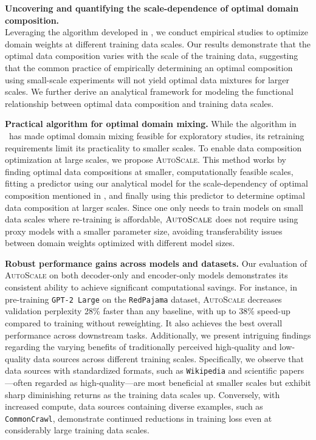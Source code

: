 \documentclass{article} %
\newcommand*\circled[1]{\tikz[baseline=(char.base)]{
            \node[shape=circle,draw,inner sep=2pt] (char) {#1};}}
\begin{document}
\small{\circled{2}}\normalsize \textbf{ Uncovering and quantifying the scale-dependence of optimal domain composition.\vspace{-0.3em}} \\
Leveraging the algorithm developed in \small{\circled{1}}\normalsize, we conduct empirical studies to optimize domain weights at different training data scales. Our results demonstrate that the optimal data composition varies with the scale of the training data, suggesting that the common practice of empirically determining an optimal composition using small-scale experiments will not yield optimal data mixtures for larger scales. We further derive an analytical framework for modeling the functional relationship between optimal data composition and training data scales.


\small{\circled{3}}\normalsize \textbf{ Practical algorithm for optimal domain mixing.} While the algorithm in \small{\circled{1}}\normalsize~has made optimal domain mixing feasible for exploratory studies, its retraining requirements limit its practicality to smaller scales. To enable data composition optimization at large scales, we propose \textsc{AutoScale}. This method works by finding optimal data compositions at smaller, computationally feasible scales, fitting a predictor using our analytical model for the scale-dependency of optimal composition mentioned in \small{\circled{2}}\normalsize, and finally using this predictor to determine optimal data composition at larger scales. Since one only needs to train models on small data scales where re-training is affordable, $\textsc{AutoScale}$ does not require using proxy models with a smaller parameter size, avoiding transferability issues between domain weights optimized with different model sizes.

\small{\circled{4}}\normalsize \textbf{ Robust performance gains across models and datasets.} Our evaluation of \textsc{AutoScale} on both decoder-only and encoder-only models demonstrates its consistent ability to achieve significant computational savings. For instance, in pre-training \texttt{GPT-2 Large} \citep{radford2019language} on the \texttt{RedPajama} dataset, \textsc{AutoScale} decreases validation perplexity 28\% faster than any baseline, with up to 38\% speed-up compared to training without reweighting. It also achieves the best overall performance across downstream tasks.
Additionally, we present intriguing findings regarding the varying benefits of traditionally perceived high-quality and low-quality data sources across different training scales. Specifically, we observe that data sources with standardized formats, such as \texttt{Wikipedia} and scientific papers---often regarded as high-quality---are most beneficial at smaller scales but exhibit sharp diminishing returns as the training data scales up. Conversely, with increased compute, data sources containing diverse examples, such as \texttt{CommonCrawl}, demonstrate continued reductions in training loss even at considerably large training data scales.
\end{document}
